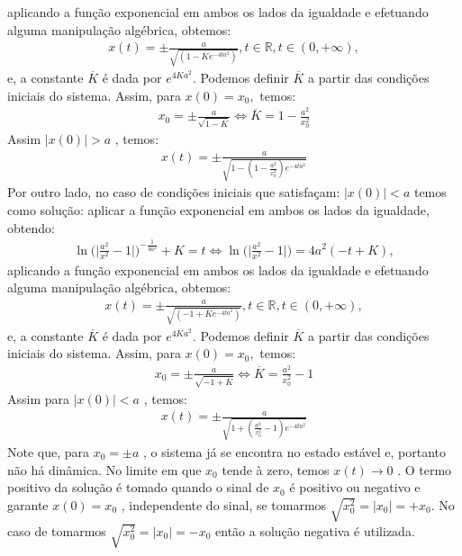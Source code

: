 aplicando a função exponencial em ambos os lados da igualdade e efetuando alguma manipulação algébrica, obtemos:
\begin{eqnarray}\label{Integrada3}
x(t) = \pm \frac{a}{\sqrt{(1- \overline K e^{-4ta^{2}} )}},  t  \in \mathbb{R} ,  t  \in (0, +\infty),
\end{eqnarray}
e, a constante $\overline{K}$ é dada por $e^{4Ka^{2}}$. Podemos definir $\overline{K}$ a partir das condições iniciais do sistema. Assim, para $x(0) = x_{0},$ temos:
\begin{eqnarray}\label{X2}
x_{0} = \pm \frac{a}{\sqrt{1-\overline{K}}} \Leftrightarrow \overline{K} = 1- \frac{a^{2}}{x_{0}^{2}}
\end{eqnarray}
Assim $|x(0)| > a$ , temos:
\begin{eqnarray}\label{S}
x(t) = \pm \frac{a}{\sqrt{1-(1-\frac{a^{2}}{x_{0}^{2}})e^{-4ta^{2}}}}
\end{eqnarray}
Por outro lado, no caso de condições iniciais que satisfaçam: $|x(0)| < a$ temos como solução:
aplicar a função exponencial em ambos os lados da igualdade, obtendo:
\begin{eqnarray}\label{Integrada4}
\ln \biggl( \biggl | \frac{a^{2}}{x^{2}} - 1 \biggr | \biggr)^{-\frac{1}{4a^{2}}} + K = t \Leftrightarrow \ln \biggl( \biggl | \frac{a^{2}}{x^{2}} - 1 \biggr | \biggr) = 4a^{2}(-t+K), 
\end{eqnarray}
aplicando a função exponencial em ambos os lados da igualdade e efetuando alguma manipulação algébrica, obtemos:
\begin{eqnarray}\label{Integrada6}
x(t) = \pm \frac{a}{\sqrt{( -1 + \overline{K} e^{-4ta^{2}} )}},  t  \in \mathbb{R} ,  t  \in (0, +\infty),
\end{eqnarray}
e, a constante $\overline{K}$ é dada por $e^{4Ka^{2}}$. Podemos definir $\overline{K}$ a partir das condições iniciais do sistema. Assim, para $x(0) = x_{0},$ temos:
\begin{eqnarray}\label{X}
x_{0} = \pm \frac{a}{\sqrt{-1+\overline{K}}} \Leftrightarrow \overline{K} = \frac{a^{2}}{x_{0}^{2}} - 1
\end{eqnarray}
Assim para $|x(0)| < a$ , temos:
\begin{eqnarray}\label{S2}
x(t) = \pm \frac{a}{\sqrt{1+(\frac{a^{2}}{x_{0}^{2}} - 1)e^{-4ta^{2}}}}
\end{eqnarray}
Note que, para $x_{0} = \pm a $ , o sistema já se encontra no estado estável e, portanto não há dinâmica. No limite em que $x_{0}$ tende à zero, temos $x(t) \rightarrow 0$ .
O termo positivo da solução é tomado quando o sinal de $x_{0}$ é positivo ou negativo e garante $x(0) = x_{0} $ , independente do sinal, se tomarmos $ \sqrt{x_{0}^{2}} = |x_{0}| = +x_{0}$. No caso de tomarmos $ \sqrt{x_{0}^{2}} = |x_{0}| = -x_{0}$ então a solução negativa é utilizada. 


